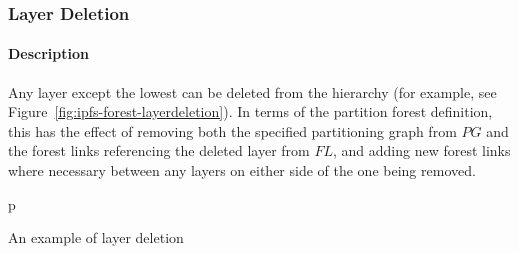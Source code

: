 \subsubsection{Layer Deletion}


\paragraph{Description}

Any layer except the lowest can be deleted from the hierarchy (for example, see Figure~\ref{fig:ipfs-forest-layerdeletion}). In terms of the partition forest definition, this has the effect of removing both the specified partitioning graph from $\textit{PG}$ and the forest links referencing the deleted layer from $\textit{FL}$, and adding new forest links where necessary between any layers on either side of the one being removed.

\begin{stusubfig}{p}
	\\
\caption{An example of layer deletion}
\label{fig:ipfs-forest-layerdeletion}
\end{stusubfig}

